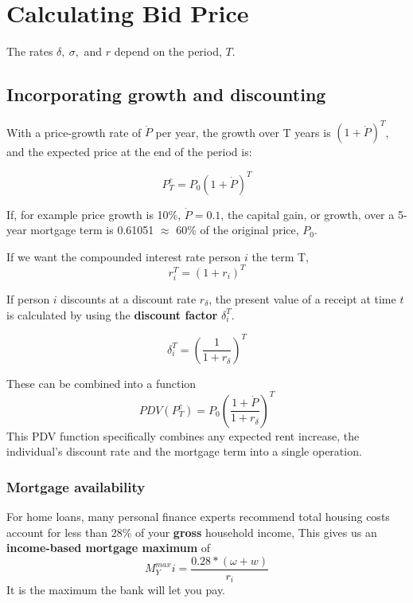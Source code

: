 \chapter[Bidding]{Calculating Bid Price}
\label{AppendixBidPrice}

The rates $\delta,\ \sigma,$ and $r$ depend on the period, $T$. 

\section{Incorporating growth and discounting}

With a price-growth rate of $\dot P$ per year, the growth over T years is $(1+\dot P)^T$, and  %
the expected price at the end of the period is:

\[P^e_T=P_0(1+\dot P)^T\]

If, for example price growth is 10\%, $\dot P= 0.1$, the {capital gain}, or growth, over a 5-year mortgage term is 0.61051 $\approx$ 60\% of the original price, $P_0$.

If we want the compounded interest rate person $i$ the term T,
\[r_i^T=(1+r_i)^T\]

If person $i$  discounts at a discount rate $r_\delta$, the present value of a receipt at time $t$ is calculated by using the \textbf{discount factor} $\delta_i^T$.

\[\delta_i^T= \left( \frac{1}{1+r_\delta} \right)^T \]
 
These can be combined into a function %
\[ PDV(P^e_T)=P_0\left( \frac{1+\dot P}{1+r_\delta} \right)^T \]
This PDV function specifically combines any expected rent increase, the individual's discount rate and the mortgage term into a single operation. 


\subsection{Mortgage availability}
For home loans, many personal finance experts recommend total housing costs account for less than 28\% of your \textbf{gross} household income, This gives us an \textbf{income-based  mortgage maximum} of \[M^{max}_Yi = \frac{0.28*(\omega+w)}{r_i}\] It is the maximum the bank will let you pay.

